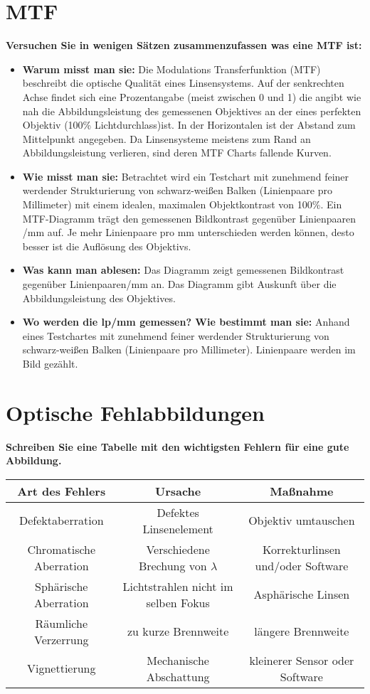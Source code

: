 \documentclass[a4paper]{article}
\begin{document}
	\section{MTF}
	\textbf{Versuchen Sie in wenigen Sätzen zusammenzufassen was eine MTF ist:}\\
	\begin{itemize}
		\item \textbf{Warum misst man sie:} Die Modulations Transferfunktion (MTF) beschreibt die optische Qualität eines Linsensystems. Auf der senkrechten Achse findet sich eine Prozentangabe (meist zwischen 0 und 1) die angibt wie nah die Abbildungsleistung des gemessenen Objektives an der eines perfekten Objektiv (100\% Lichtdurchlass)ist.
		In der Horizontalen ist der Abstand zum Mittelpunkt angegeben. Da Linsensysteme meistens zum Rand an Abbildungsleistung verlieren, sind deren MTF Charts fallende Kurven.\\
		\item \textbf{Wie misst man sie:} Betrachtet wird ein Testchart mit zunehmend feiner werdender Strukturierung von schwarz-weißen Balken (Linienpaare pro Millimeter) mit einem idealen, maximalen Objektkontrast von 100\%. Ein MTF-Diagramm trägt den gemessenen Bildkontrast gegenüber Linienpaaren /mm auf. Je mehr Linienpaare pro mm unterschieden werden können, desto besser ist die Auflösung des Objektivs.\\
		\item \textbf{Was kann man ablesen:} Das Diagramm zeigt gemessenen Bildkontrast gegenüber Linienpaaren/mm an. Das Diagramm gibt Auskunft über die Abbildungsleistung des Objektives.\\
		\item \textbf{Wo werden die lp/mm gemessen? Wie bestimmt man sie:} Anhand eines Testchartes mit zunehmend feiner werdender Strukturierung von schwarz-weißen Balken (Linienpaare pro Millimeter). Linienpaare werden im Bild gezählt. \\
	\end{itemize}
	
	\newpage
	
	\section{Optische Fehlabbildungen}
	\textbf{Schreiben Sie eine Tabelle mit den wichtigsten Fehlern für eine gute Abbildung.}\\
		\begin{tabular}{ c|c|c }
			Art des Fehlers & Ursache & Maßnahme \\ 
			\hline
			Defektaberration & Defektes Linsenelement & Objektiv umtauschen \\
			Chromatische Aberration & Verschiedene Brechung von $\lambda$ & Korrekturlinsen und/oder Software\\
			Sphärische Aberration & Lichtstrahlen nicht im selben Fokus & Asphärische Linsen\\
			Räumliche Verzerrung & zu kurze Brennweite & längere Brennweite\\
			Vignettierung & Mechanische Abschattung & kleinerer Sensor oder Software
		\end{tabular}
\end{document}
